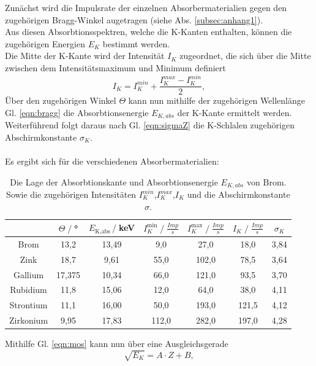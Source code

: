 Zunächst wird die Impulsrate der einzelnen Absorbermaterialien gegen den zugehörigen
Bragg-Winkel augetragen (siehe Abs. \ref{subsec:anhang1}).\\ Aus diesen Absorbtionsspektren, welche die K-Kanten enthalten, können
die zugehörigen Energien $E_K$ bestimmt werden.\\
Die Mitte der K-Kante wird der Intensität $I_K$ zugeordnet, die sich
über die Mitte zwischen dem Intensitätsmaximum und Minimum definiert
\begin{equation}
    I_K=I_K^{min}+\frac{I_K^{max}-I_K^{min}}{2},
    \label{eqn:intensität}
\end{equation}
Über den zugehörigen Winkel $\Theta$ kann nun mithilfe der zugehörigen Wellenlänge
Gl. \ref{eqn:bragg} die Absorbtionsenergie $E_{K,abs}$ der K-Kante ermittelt werden.
Weiterführend folgt daraus nach Gl. \ref{eqn:sigmaZ} die K-Schlalen zugehörigen Abschirmkonstante $\sigma_K$.\\\\
Es ergibt sich für die verschiedenen Absorbermaterialien:
\begin{table}
    \centering
    \begin{tabular}{c | c c c c c c}
        \toprule
        &$\Theta\;/\;$° & $E_{\text{K,abs}}\,/\;$keV & $I_K^{\text{min}}\;/\;\frac{Imp}{s}$ & $I_K^{\text{max}}\;/\;\frac{Imp}{s}$ & $I_K\;/\;\frac{Imp}{s}$ & $\sigma_K$\\
        \midrule
        Brom & 13,2 & 13,49 & 9,0 & 27,0 & 18,0 & 3,84\\
        Zink & 18,7 & 9,61 & 55,0 & 102,0 & 78,5 & 3,64\\
        Gallium & 17,375 & 10,34 & 66,0 & 121,0 & 93,5 & 3,70\\
        Rubidium & 11,8 & 15,06 & 12,0 & 64,0 & 38,0 & 4,11\\
        Strontium & 11,1 & 16,00 & 50,0 & 193,0 & 121,5 & 4,12\\
        Zirkonium & 9,95 & 17,83 & 112,0 & 282,0 & 197,0 & 4,28\\
        \bottomrule
    \end{tabular}
    \caption{Die Lage der Absorbtionskante und Absorbtionsenergie $E_{K,abs}$ von Brom.
        Sowie die zugehörigen Intensitäten $I_K^{min}$,$I_K^{max}$,$I_K$ und die Abschirmkonstante $\sigma$.}
\end{table}
\newpage
Mithilfe Gl. \ref{eqn:mos} kann nun über eine Ausgleichsgerade
\begin{equation}
        \sqrt{E_K}=A\cdot Z +B,
\end{equation}
